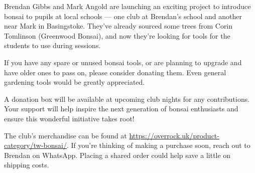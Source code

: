 \label{2025-11-news}

\noindent
Brendan Gibbs and Mark Angold are launching an exciting project to introduce bonsai to pupils at local schools --- one club at Brendan's school and another near Mark in Basingstoke. They've already sourced some trees from Corin Tomlinson (Greenwood Bonsai), and now they're looking for tools for the students to use during sessions.

If you have any spare or unused bonsai tools, or are planning to upgrade and have older ones to pass on, please consider donating them. Even general gardening tools would be greatly appreciated.

A donation box will be available at upcoming club nights for any contributions. Your support will help inspire the next generation of bonsai enthusiasts and ensure this wonderful initiative takes root!


	
	

\medskip	
{}
\noindent
The club's merchandise can be found at \url{https://overrock.uk/product-category/tw-bonsai/}. If you're thinking of making a purchase soon, reach out to Brendan on WhatsApp. Placing a shared order could help save a little on shipping costs.


